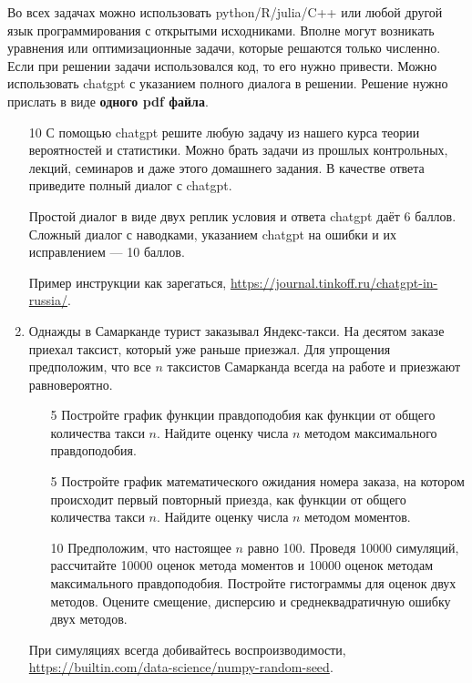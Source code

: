 \documentclass[12pt]{article} %
\begin{document}
Во всех задачах можно использовать python/R/julia/C++ или любой другой язык программирования с открытыми исходниками. 
Вполне могут возникать уравнения или оптимизационные задачи, которые решаются только численно.
Если при решении задачи использовался код, то его нужно привести. 
Можно использовать chatgpt с указанием полного диалога в решении.  
Решение нужно прислать в виде \textbf{одного pdf файла}. 

\begin{enumerate}
    \item [10] С помощью chatgpt решите любую задачу из нашего курса теории вероятностей и статистики. 
   Можно брать задачи из прошлых контрольных, лекций, семинаров и даже этого домашнего задания.
   В качестве ответа приведите полный диалог с chatgpt. 

   Простой диалог в виде двух реплик условия и ответа chatgpt даёт 6 баллов. 
   Сложный диалог с наводками, указанием chatgpt на ошибки и их исправлением — 10 баллов. 

   Пример инструкции как зарегаться, \url{https://journal.tinkoff.ru/chatgpt-in-russia/}.

    \item Однажды в Самарканде турист заказывал Яндекс-такси. 
    На десятом заказе приехал таксист, который уже раньше приезжал. 
    Для упрощения предположим, что все $n$ таксистов Самарканда всегда на работе и приезжают равновероятно.

    \begin{enumerate}
      \item [5] Постройте график функции правдоподобия как функции от общего количества такси $n$. 
      Найдите оценку числа $n$ методом максимального правдоподобия. 
      \item [5] Постройте график математического ожидания номера заказа, 
      на котором происходит первый повторный приезда, как функции от общего количества такси $n$. 
      Найдите оценку числа $n$ методом моментов.
      \item [10] Предположим, что настоящее $n$ равно 100. 
      Проведя 10000 симуляций, рассчитайте 10000 оценок метода моментов и 10000 оценок методам максимального правдоподобия. 
      Постройте гистограммы для оценок двух методов. 
      Оцените смещение, дисперсию и среднеквадратичную ошибку двух методов. 
    \end{enumerate}

    При симуляциях всегда добивайтесь воспроизводимости, \url{https://builtin.com/data-science/numpy-random-seed}.
    

\end{enumerate}
\end{document}
